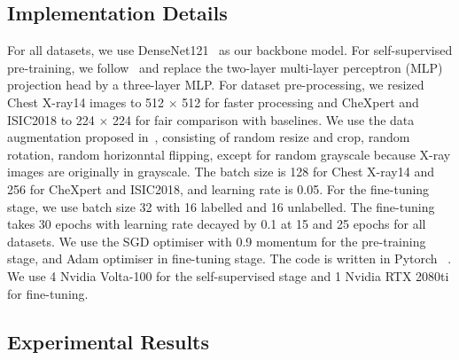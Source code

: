 \documentclass[runningheads]{llncs}
\begin{document}
\subsection{Implementation Details}

For all datasets, we use DenseNet121~\cite{huang2017densely} as our backbone model. For self-supervised pre-training, we follow~\cite{chen2020big} and replace the two-layer multi-layer perceptron (MLP) projection head by a three-layer MLP.
For dataset pre-processing, we resized Chest X-ray14 images to 512 $\times$ 512 for faster processing and CheXpert and ISIC2018 to 224 $\times$ 224 for fair comparison with baselines. 
We use the data augmentation proposed in~\cite{simclr}, consisting of random resize and crop, random rotation, random horizonntal flipping, except for random grayscale because X-ray images are originally in grayscale.
The batch size is 128 for Chest X-ray14 and 256 for CheXpert and ISIC2018, and learning rate is 0.05. For the fine-tuning stage, we use batch size 32 with 16 labelled and 16 unlabelled. The fine-tuning takes 30 epochs with learning rate decayed by 0.1 at 15 and 25 epochs for all datasets. We use the SGD optimiser with 0.9 momentum for the pre-training stage, and Adam optimiser in fine-tuning stage. The code is written in Pytorch ~\cite{paszke2019pytorch}. 
We use 4 Nvidia Volta-100 for the self-supervised stage and 1 Nvidia RTX 2080ti for fine-tuning.






\vspace{-.2in}
\subsection{Experimental Results}
\end{document}
